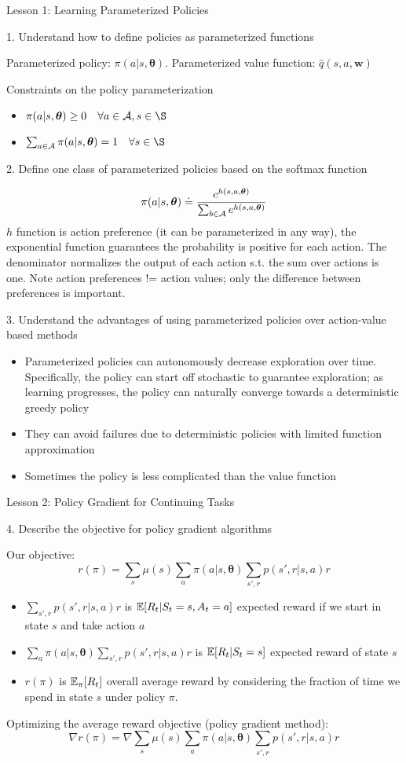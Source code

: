 \documentclass[sutton_barto_notes.tex]{subfiles}
\begin{document}
Lesson 1: Learning Parameterized Policies 

1. Understand how to define policies as parameterized functions 

Parameterized policy: $\pi(a|s,\bm{\theta})$. Parameterized value function: $\hat{q}(s,a,\bm{w})$

Constraints on the policy parameterization
\begin{itemize}
\item $\pi(a|s,\bm{\theta}) \geq 0 \quad \forall a \in \A, s \in \S$
\item $\sum_{a\in\A} \pi(a|s,\bm{\theta}) = 1 \quad \forall s \in \S$
\end{itemize}

2. Define one class of parameterized policies based on the softmax function 

$$\pi(a|s,\bm{\theta})\doteq \frac{e^{h(s,a,\bm{\theta})}}{\sum_{b\in\operatorname*{\mathcal{A}}}e^{h(s,a,\bm{\theta})}}$$
$h$ function is action preference (it can be parameterized in any way), the exponential function guarantees the probability is positive for each action. The denominator normalizes the output of each action s.t. the sum over actions is one.
Note action preferences != action values; only the difference between preferences is important.

3. Understand the advantages of using parameterized policies over action-value based methods 

\begin{itemize}
\item Parameterized policies can autonomously decrease exploration over time. Specifically, the policy can start off stochastic to guarantee exploration; as learning progresses, the policy can naturally converge towards a deterministic greedy policy
\item They can avoid failures due to deterministic policies with limited function approximation
\item Sometimes the policy is less complicated than the value function
\end{itemize}

Lesson 2: Policy Gradient for Continuing Tasks 

4. Describe the objective for policy gradient algorithms 

Our objective:
$$r(\pi) = \sum_s \mu(s) \sum_a \pi(a|s,\bm{\theta}) \sum_{s',r} p(s',r|s,a)r $$
\begin{itemize}
\item $\sum_{s',r} p(s',r|s,a)r$ is $\operatorname*{\mathbb{E}}[R_t | S_t=s,A_t=a]$ expected reward if we start in state $s$ and take action $a$
\item $\sum_a \pi(a|s,\bm{\theta}) \sum_{s',r} p(s',r|s,a)r$ is $\operatorname*{\mathbb{E}}[R_t | S_t=s]$ expected reward of state $s$
\item $r(\pi)$ is $\operatorname*{\mathbb{E}}_\pi [ R_t ]$ overall average reward by considering the fraction of time we spend in state $s$ under policy $\pi$.
\end{itemize}
Optimizing the average reward objective (policy gradient method):
$$\nabla r(\pi) = \nabla \sum_s \mu(s) \sum_a \pi(a|s,\bm{\theta}) \sum_{s',r} p(s',r|s,a)r $$
\end{document}
